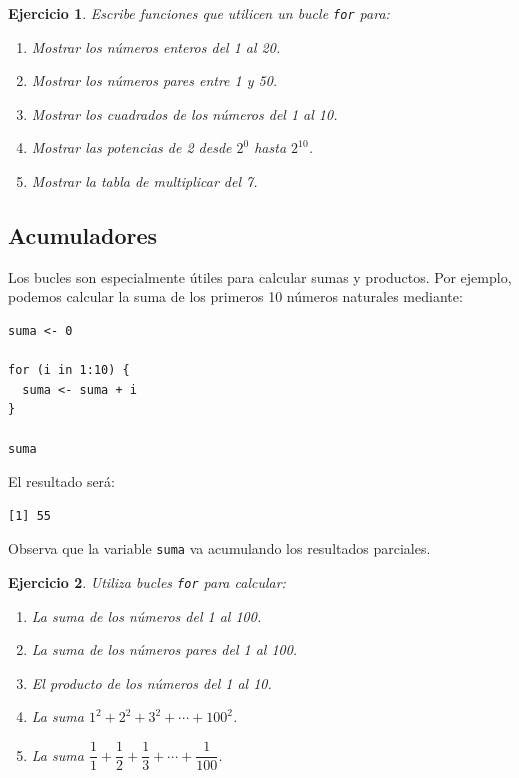 \documentclass[11pt,a4paper]{article}
\theoremstyle{exercise}
\newtheorem{exercise}{Ejercicio}
\begin{document}
\begin{exercise}
Escribe funciones que utilicen un bucle \texttt{for} para:

\begin{enumerate}[label=\alph*)]
  \item Mostrar los números enteros del 1 al 20.
  \item Mostrar los números pares entre 1 y 50.
  \item Mostrar los cuadrados de los números del 1 al 10.
  \item Mostrar las potencias de 2 desde $2^0$ hasta $2^{10}$.
  \item Mostrar la tabla de multiplicar del 7.
\end{enumerate}
\end{exercise}

\subsection{Acumuladores}

Los bucles son especialmente útiles para calcular sumas y productos. Por ejemplo, podemos calcular la suma de los primeros 10 números naturales mediante:

\begin{lstlisting}[style=rstyle]
suma <- 0

for (i in 1:10) {
  suma <- suma + i
}

suma
\end{lstlisting}

\noindent El resultado será:

\begin{lstlisting}[style=routput]
[1] 55
\end{lstlisting}

\noindent Observa que la variable \texttt{suma} va acumulando los resultados parciales.

\begin{exercise}
Utiliza bucles \texttt{for} para calcular:

\begin{enumerate}[label=\alph*)]
  \item La suma de los números del 1 al 100.
  \item La suma de los números pares del 1 al 100.
  \item El producto de los números del 1 al 10.
  \item La suma $1^2+2^2+3^2+\cdots+100^2$.
  \item La suma $\dfrac11+\dfrac12+\dfrac13+\cdots+\dfrac1{100}$.
\end{enumerate}
\end{exercise}
\end{document}
